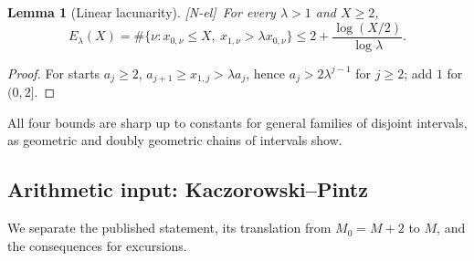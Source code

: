 \documentclass[11pt]{amsart}
\numberwithin{equation}{section}
\theoremstyle{plain}
\newtheorem{lemma}[theorem]{Lemma}
\theoremstyle{definition}
\theoremstyle{remark}
\newcommand{\tagNE}{\textup{[N-el]}}
\begin{document}
\begin{lemma}[Linear lacunarity]
\label{lem:linear-lacunary}
\tagNE\ For every $\lambda>1$ and $X\ge2$,
\begin{equation}
\label{eq:linear-lacunary-count}
E_\lambda(X)=\#\{\nu:x_{0,\nu}\le X,\ x_{1,\nu}>\lambda x_{0,\nu}\}
\le2+\frac{\log(X/2)}{\log\lambda}.
\end{equation}
\end{lemma}

\begin{proof}
For starts $a_j\ge2$, $a_{j+1}\ge x_{1,j}>\lambda a_j$, hence
$a_j>2\lambda^{j-1}$ for $j\ge2$; add $1$ for $(0,2]$.
\end{proof}

All four bounds are sharp up to constants for general families of disjoint
intervals, as geometric and doubly geometric chains of intervals show.

\subsection{Arithmetic input: Kaczorowski--Pintz}

We separate the published statement, its translation from $M_0=M+2$ to
$M$, and the consequences for excursions.
\end{document}

